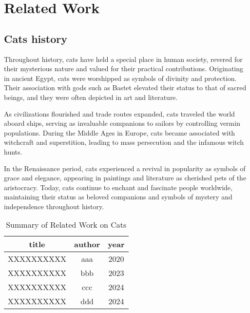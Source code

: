 \chapter{Related Work}

\section{Cats history}
Throughout history, cats have held a special place in human society, revered for their mysterious nature and valued for their practical contributions. Originating in ancient Egypt, cats were worshipped as symbols of divinity and protection. Their association with gods such as Bastet elevated their status to that of sacred beings, and they were often depicted in art and literature.

As civilizations flourished and trade routes expanded, cats traveled the world aboard ships, serving as invaluable companions to sailors by controlling vermin populations. During the Middle Ages in Europe, cats became associated with witchcraft and superstition, leading to mass persecution and the infamous witch hunts.

In the Renaissance period, cats experienced a revival in popularity as symbols of grace and elegance, appearing in paintings and literature as cherished pets of the aristocracy. Today, cats continue to enchant and fascinate people worldwide, maintaining their status as beloved companions and symbols of mystery and independence throughout history.

\begin{table}[H]
    \centering

    \caption{Summary of Related Work on Cats}

    \begin{tabular}{ccc}
        \toprule
         title&  author& year\\
        \midrule
         XXXXXXXXXX&  aaa& 2020\\
         XXXXXXXXXX&  bbb& 2023\\
         XXXXXXXXXX&  ccc& 2024\\
         XXXXXXXXXX&  ddd& 2024\\
        \bottomrule
    \end{tabular}
    
    \label{tab:my_label}
\end{table}